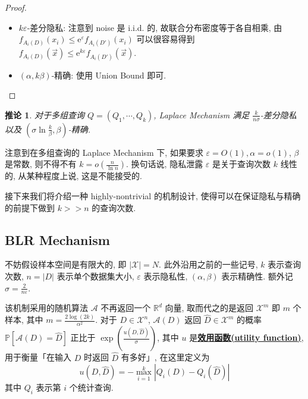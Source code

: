 \documentclass[8pt]{article}
\theoremstyle{compact}
\newtheorem{corollary}{推论}[section]
\def\obj#1{\textbf{\uline{#1}}}
\def\le{\leqslant}
\def\P#1{\mathbb{P}\left[{#1}\right]}
\def\e{\mathrm{e}}
\begin{document}
\begin{proof}
	\begin{itemize}
		\item $k\varepsilon$-差分隐私: 注意到 noise 是 i.i.d. 的, 故联合分布密度等于各自相乘, 由 $f_{A_i(D)}(x_i) \le \e^{\varepsilon}f_{A_i(D')}(x_i)$ 可以很容易得到 $f_{A_i(D)}(\vec x) \le \e^{k\varepsilon} f_{A_i(D')}(\vec x)$.
	    \item $(\alpha, k\beta)$-精确: 使用 Union Bound 即可.
	\end{itemize}
\end{proof}
\begin{corollary}
	对于多组查询 $Q = (Q_1, \cdots, Q_k)$, Laplace Mechanism 满足 $\frac{k}{n\sigma}$-差分隐私以及 $(\sigma\ln\frac{k}{\beta}, \beta)$-精确.
\end{corollary}

注意到在多组查询的 Laplace Mechanism 下, 如果要求 $\varepsilon = O(1), \alpha = o(1)$, $\beta$ 是常数, 则不得不有 $k = o\left(\frac{n}{\ln n}\right)$. 换句话说, 隐私泄露 $\varepsilon$ 是关于查询次数 $k$ 线性的, 从某种程度上说, 这是不能接受的.

接下来我们将介绍一种 highly-nontrivial 的机制设计, 使得可以在保证隐私与精确的前提下做到 $k >> n$ 的查询次数.

\subsection{BLR Mechanism}

不妨假设样本空间是有限大的, 即 $|\mathcal X| = N$. 此外沿用之前的一些记号, $k$ 表示查询次数, $n = |D|$ 表示单个数据集大小, $\varepsilon$ 表示隐私性, $(\alpha, \beta)$ 表示精确性. 额外记 $\sigma = \frac{2}{n\varepsilon}$.

该机制采用的随机算法 $\mathcal A$ 不再返回一个 $\mathbb R^d$ 向量, 取而代之的是返回 $\mathcal X^m$ 即 $m$ 个样本, 其中 $m = \frac{2\log(2k)}{\alpha^2}$. 对于 $D \in \mathcal X^n$, $\mathcal A(D)$ 返回 $\hat{D} \in \mathcal X^m$ 的概率 $\P{\mathcal A(D) = \hat{D}}$ 正比于 $\exp\left(\frac{u(D, \hat{D})}{\sigma}\right)$, 其中 $u$ 是\obj{效用函数(utility function)}, 用于衡量「在输入 $D$ 时返回 $\hat{D}$ 有多好」, 在这里定义为 $$u(D, \hat{D}) = -\max_{i=1}^{k}|Q_i(D) - Q_i(\hat{D})|$$ 其中 $Q_i$ 表示第 $i$ 个统计查询.
\end{document}
